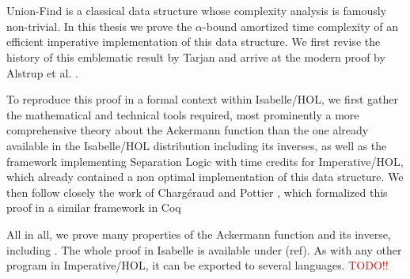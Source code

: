 \chapter{\abstractname}

Union-Find is a classical data structure whose complexity analysis is famously non-trivial. In this thesis we prove the $\alpha$-bound amortized time complexity of an efficient imperative implementation of this data structure. We first revise the history of this emblematic result by Tarjan \cite{Tarjan1975b} and arrive at the modern proof by Alstrup et al. \cite{Alstrup14}.

To reproduce this proof in a formal context within Isabelle/HOL, we first gather the mathematical and technical tools required, most prominently a more comprehensive theory about the Ackermann function than the one already available in the Isabelle/HOL distribution including its inverses, as well as the framework implementing Separation Logic with time credits for Imperative/HOL, which already contained a non optimal implementation of this data structure. We then follow closely the work of Chargéraud and Pottier \cite{chargueraud17}, which formalized this proof in a similar framework in Coq

All in all, we prove many properties of the Ackermann function and its inverse, including . The whole proof in Isabelle is available under (ref). As with any other program in Imperative/HOL, it can be exported to several languages. \textcolor{red}{TODO!!}

